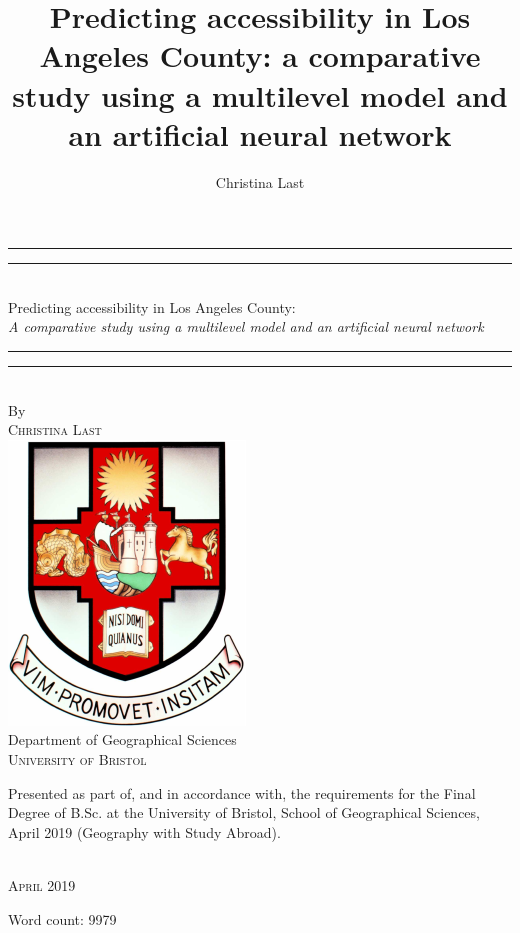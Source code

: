 \documentclass[a4paper,UKenglish]{lipics-v2018}
\title{Predicting accessibility in Los Angeles County: a comparative study using a multilevel model and an artificial neural network}
\author{Christina Last}{School of Geographical Sciences, University of Bristol, UK}{cl15540@bristol.ac.uk}{}{}
\begin{document}
\vspace*{13mm}
\begin{center}
\rule[0.5ex]{\linewidth}{2pt}\vspace*{-\baselineskip}\vspace*{3.2pt}
\rule[0.5ex]{\linewidth}{1pt}\\[\baselineskip]
{\LARGE Predicting accessibility in Los Angeles County: }\\[4mm]
{\Large \textit{A comparative study using a multilevel model and an artificial neural network}}\\
\rule[0.5ex]{\linewidth}{1pt}\vspace*{-\baselineskip}\vspace{3.2pt}
\rule[0.5ex]{\linewidth}{2pt}\\
\vspace{6.5mm}
{\large By}\\
\vspace{6.5mm}
{\large\textsc{Christina Last}}\\
\vspace{11mm}
\includegraphics[scale=0.6]{Cover_page/bristolcrest_colour.pdf}\\
\vspace{6mm}
{\large Department of Geographical Sciences \\
\textsc{University of Bristol}}\\
\vspace{11mm}

\begin{minipage}{10cm}
Presented as part of, and in accordance with, the requirements for the Final Degree of B.Sc. at the University of Bristol, School of Geographical Sciences, April 2019 (Geography with Study Abroad).
\end{minipage}\\
\vspace{9mm}
{\large\textsc{April 2019}}
\vspace{12mm}
\end{center}
\begin{flushright}
{\small Word count: 9979}
\end{flushright}
\pagebreak
\end{document}
